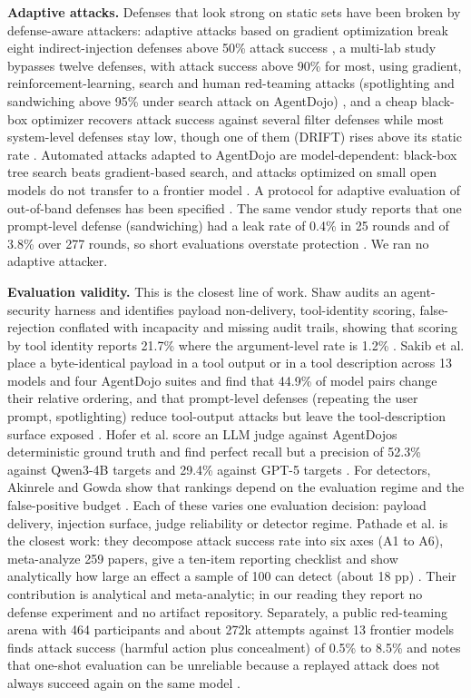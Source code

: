 \documentclass[10pt]{article}
\begin{document}
\textbf{Adaptive attacks.} Defenses that look strong on static sets have been broken by defense-aware attackers: adaptive attacks based on gradient optimization break eight indirect-injection defenses above 50\% attack success \cite{arxiv2503_00061}, a multi-lab study bypasses twelve defenses, with attack success above 90\% for most, using gradient, reinforcement-learning, search and human red-teaming attacks (spotlighting and sandwiching above 95\% under search attack on AgentDojo) \cite{arxiv2510_09023}, and a cheap black-box optimizer recovers attack success against several filter defenses while most system-level defenses stay low, though one of them (DRIFT) rises above its static rate \cite{arxiv2606_15057}. Automated attacks adapted to AgentDojo are model-dependent: black-box tree search beats gradient-based search, and attacks optimized on small open models do not transfer to a frontier model \cite{arxiv2606_10525}. A protocol for adaptive evaluation of out-of-band defenses has been specified \cite{arxiv2606_26479}. The same vendor study reports that one prompt-level defense (sandwiching) had a leak rate of 0.4\% in 25 rounds and of 3.8\% over 277 rounds, so short evaluations overstate protection \cite{arxiv2604_23887}. We ran no adaptive attacker.

\textbf{Evaluation validity.} This is the closest line of work. Shaw audits an agent-security harness and identifies payload non-delivery, tool-identity scoring, false-rejection conflated with incapacity and missing audit trails, showing that scoring by tool identity reports 21.7\% where the argument-level rate is 1.2\% \cite{arxiv2609_32691}. Sakib et al. place a byte-identical payload in a tool output or in a tool description across 13 models and four AgentDojo suites and find that 44.9\% of model pairs change their relative ordering, and that prompt-level defenses (repeating the user prompt, spotlighting) reduce tool-output attacks but leave the tool-description surface exposed \cite{arxiv2605_30454}. Hofer et al. score an LLM judge against AgentDojo\textquotesingle s deterministic ground truth and find perfect recall but a precision of 52.3\% against Qwen3-4B targets and 29.4\% against GPT-5 targets \cite{arxiv2606_10525}. For detectors, Akinrele and Gowda show that rankings depend on the evaluation regime and the false-positive budget \cite{arxiv2605_26999}. Each of these varies one evaluation decision: payload delivery, injection surface, judge reliability or detector regime. Pathade et al. is the closest work: they decompose attack success rate into six axes (A1 to A6), meta-analyze 259 papers, give a ten-item reporting checklist and show analytically how large an effect a sample of 100 can detect (about 18 pp) \cite{arxiv2609_25173}. Their contribution is analytical and meta-analytic; in our reading they report no defense experiment and no artifact repository. Separately, a public red-teaming arena with 464 participants and about 272k attempts against 13 frontier models finds attack success (harmful action plus concealment) of 0.5\% to 8.5\% and notes that one-shot evaluation can be unreliable because a replayed attack does not always succeed again on the same model \cite{arxiv2603_15714}.
\end{document}
